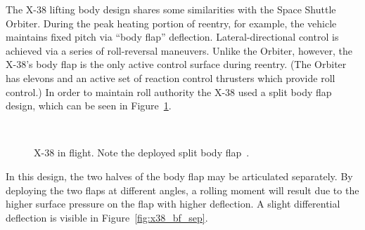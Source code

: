 \clearpage
The X-38 lifting body design shares some similarities with the Space Shuttle Orbiter.  During the peak heating portion of reentry, for example,  the vehicle maintains fixed pitch via ``body flap'' deflection. Lateral-directional control is achieved via a series of roll-reversal maneuvers.  Unlike the Orbiter, however, the X-38's body flap is the only active control surface during reentry.  (The Orbiter has elevons and an active set of reaction control thrusters which provide roll control.)  In order to maintain roll authority the X-38 used a split body flap design, which can be seen in Figure~\ref{fig:x38_bf}. 
\begin{figure}[hbtp]
  \begin{center}
     \\
    \caption[X-38 in flight.]{X-38 in flight. Note the deployed split body flap~\cite{dfrc_photo_gallery}.\label{fig:x38_bf}}
  \end{center}
\end{figure}
In this design, the two halves of the body flap may be articulated separately. By deploying the two flaps at different angles, a rolling moment will result due to the higher surface pressure on the flap with higher deflection.  A slight differential deflection is visible in Figure~\ref{fig:x38_bf_sep}.

